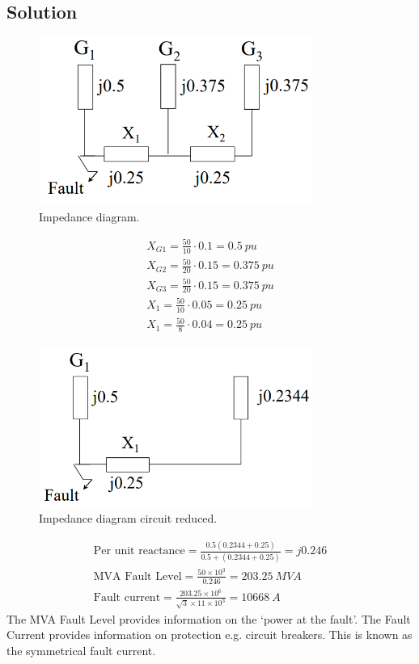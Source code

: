 \documentclass[class=report, crop=false, 12pt,a4paper]{standalone}
\begin{document}
\subsection{Solution}
\begin{figure}[H]
	\centering
	\includegraphics[width = 0.8\textwidth]{../img/figure18.png}
	\caption{Impedance diagram.}
\end{figure}
\begin{gather}
	X_{G1} = \frac{50}{10}\cdot 0.1 = \SI{0.5}{pu}\\
	X_{G2} = \frac{50}{20}\cdot 0.15 = \SI{0.375}{pu}\\
	X_{G3} = \frac{50}{20}\cdot 0.15 = \SI{0.375}{pu}\\
	X_1 = \frac{50}{10}\cdot 0.05 = \SI{0.25}{pu}\\
	X_1 = \frac{50}{8}\cdot 0.04 = \SI{0.25}{pu}
\end{gather}
\begin{figure}[H]
	\centering
	\includegraphics[width = 0.8\textwidth]{../img/figure19.png}
	\caption{Impedance diagram circuit reduced.}
\end{figure}
\begin{gather}
	\textrm{Per unit reactance} = \frac{0.5\left(0.2344 + 0.25\right)}{0.5 + \left(0.2344 + 0.25\right)} = j0.246\\
	\textrm{MVA Fault Level} = \frac{50\times 10^3}{0.246} = \SI{203.25}{MVA}\\
	\textrm{Fault current} = \frac{203.25 \times 10^6}{\sqrt{3}\times 11\times 10^3} = \SI{10668}{A}
\end{gather}
The MVA Fault Level provides information on the `power at the fault'. The Fault Current provides information on protection e.g. circuit breakers. This is known as the symmetrical fault current.
\end{document}
